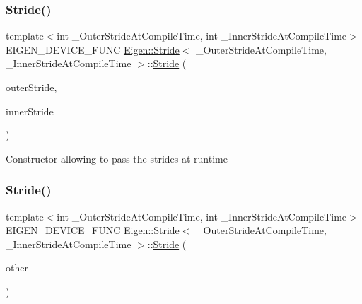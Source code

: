 \subsubsection{\texorpdfstring{Stride()}{Stride()}\hspace{0.1cm}{\footnotesize\ttfamily [2/3]}}
{\footnotesize\ttfamily template$<$int \+\_\+\+Outer\+Stride\+At\+Compile\+Time, int \+\_\+\+Inner\+Stride\+At\+Compile\+Time$>$ \\
E\+I\+G\+E\+N\+\_\+\+D\+E\+V\+I\+C\+E\+\_\+\+F\+U\+NC \mbox{\hyperlink{class_eigen_1_1_stride}{Eigen\+::\+Stride}}$<$ \+\_\+\+Outer\+Stride\+At\+Compile\+Time, \+\_\+\+Inner\+Stride\+At\+Compile\+Time $>$\+::\mbox{\hyperlink{class_eigen_1_1_stride}{Stride}} (\begin{DoxyParamCaption}\item[{\mbox{\hyperlink{class_eigen_1_1_stride_a96c2dfb0ce43fd8e19adcdf6094f5f63}{Index}}}]{outer\+Stride,  }\item[{\mbox{\hyperlink{class_eigen_1_1_stride_a96c2dfb0ce43fd8e19adcdf6094f5f63}{Index}}}]{inner\+Stride }\end{DoxyParamCaption})\hspace{0.3cm}{\ttfamily [inline]}}

Constructor allowing to pass the strides at runtime \mbox{\label{class_eigen_1_1_stride_a052fed680cf28ea284714be591bfbf86}} 
\subsubsection{\texorpdfstring{Stride()}{Stride()}\hspace{0.1cm}{\footnotesize\ttfamily [3/3]}}
{\footnotesize\ttfamily template$<$int \+\_\+\+Outer\+Stride\+At\+Compile\+Time, int \+\_\+\+Inner\+Stride\+At\+Compile\+Time$>$ \\
E\+I\+G\+E\+N\+\_\+\+D\+E\+V\+I\+C\+E\+\_\+\+F\+U\+NC \mbox{\hyperlink{class_eigen_1_1_stride}{Eigen\+::\+Stride}}$<$ \+\_\+\+Outer\+Stride\+At\+Compile\+Time, \+\_\+\+Inner\+Stride\+At\+Compile\+Time $>$\+::\mbox{\hyperlink{class_eigen_1_1_stride}{Stride}} (\begin{DoxyParamCaption}\item[{const \mbox{\hyperlink{class_eigen_1_1_stride}{Stride}}$<$ \+\_\+\+Outer\+Stride\+At\+Compile\+Time, \+\_\+\+Inner\+Stride\+At\+Compile\+Time $>$ \&}]{other }\end{DoxyParamCaption})\hspace{0.3cm}{\ttfamily [inline]}}

